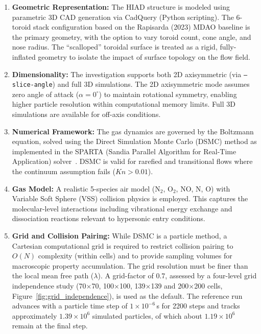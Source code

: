 \begin{enumerate}
    \item \textbf{Geometric Representation:} The HIAD structure is modeled using parametric 3D CAD generation via CadQuery (Python scripting). The 6-toroid stack configuration based on the Rapisarda (2023) MDAO baseline is the primary geometry, with the option to vary toroid count, cone angle, and nose radius. The ``scalloped'' toroidal surface is treated as a rigid, fully-inflated geometry to isolate the impact of surface topology on the flow field.

    \item \textbf{Dimensionality:} The investigation supports both 2D axisymmetric (via \texttt{--slice-angle}) and full 3D simulations. The 2D axisymmetric mode assumes zero angle of attack ($\alpha = 0^\circ$) to maintain rotational symmetry, enabling higher particle resolution within computational memory limits. Full 3D simulations are available for off-axis conditions.

    \item \textbf{Numerical Framework:} The gas dynamics are governed by the Boltzmann equation, solved using the Direct Simulation Monte Carlo (DSMC) method as implemented in the SPARTA (Sandia Parallel Algorithm for Real-Time Application) solver~\cite{plimpton2014sparta}. DSMC is valid for rarefied and transitional flows where the continuum assumption fails ($Kn > 0.01$).

    \item \textbf{Gas Model:} A realistic 5-species air model (N$_2$, O$_2$, NO, N, O) with Variable Soft Sphere (VSS) collision physics is employed. This captures the molecular-level interactions including vibrational energy exchange and dissociation reactions relevant to hypersonic entry conditions.

    \item \textbf{Grid and Collision Pairing:} While DSMC is a particle method, a Cartesian computational grid is required to restrict collision pairing to $O(N)$ complexity (within cells) and to provide sampling volumes for macroscopic property accumulation. The grid resolution must be finer than the local mean free path ($\lambda$). A grid-factor of 0.7, assessed by a four-level grid independence study (70$\times$70, 100$\times$100, 139$\times$139 and 200$\times$200 cells, Figure~\ref{fig:grid_independence}), is used as the default. The reference run advances with a particle time step of $1\times10^{-6}$\,s for 2200 steps and tracks approximately $1.39\times10^{6}$ simulated particles, of which about $1.19\times10^{6}$ remain at the final step.


\end{enumerate}
